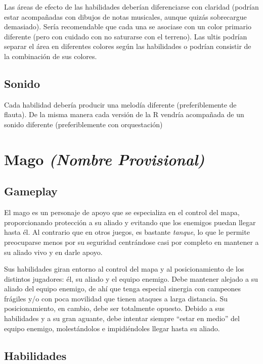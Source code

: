 Las áreas de efecto de las habilidades deberían diferenciarse con claridad (podrían estar acompañadas con dibujos de notas musicales, aunque quizás sobrecargue demasiado). Sería recomendable que cada una se asociase con un color primario diferente (pero con cuidado con no saturarse con el terreno). Las ultis podrían separar el área en diferentes colores según las habilidades o podrían consistir de la combinación de sus colores.

\subsection{Sonido}
Cada habilidad debería producir una melodía diferente (preferiblemente de flauta). De la misma manera cada versión de la R vendría acompañada de un sonido diferente (preferiblemente con orquestación)


\section{Mago \emph{(Nombre Provisional)}}

\subsection{Gameplay}
El mago es un personaje de apoyo que se especializa en el control del mapa, proporcionando protección a su aliado y evitando que los enemigos puedan llegar hasta él. Al contrario que en otros juegos, es bastante \emph{tanque}, lo que le permite preocuparse menos por su seguridad centrándose casi por completo en mantener a su aliado vivo y en darle apoyo.

Sus habilidades giran entorno al control del mapa y al posicionamiento de los distintos jugadores: él, su aliado y el equipo enemigo. Debe mantener alejado a su aliado del equipo enemigo, de ahí que tenga especial sinergia con campeones frágiles y/o con poca movilidad que tienen ataques a larga distancia. Su posicionamiento, en cambio, debe ser totalmente opuesto. Debido a sus habilidades y a su gran aguante, debe intentar siempre ``estar en medio'' del equipo enemigo, molestándolos e impidiéndoles llegar hasta su aliado.

\subsection{Habilidades}
